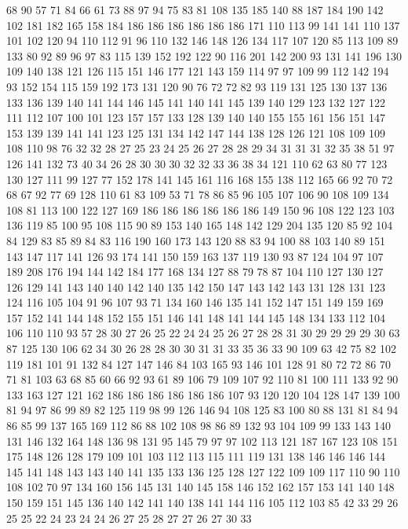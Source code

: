 68 90 57 71 84 66 61 73 88 97 94 75 83 81 108 135 185 140 88 187
184 190 142 102 181 182 165 158 184 186 186 186 186 186 186 171 110 113 99 141
141 110 137 101 102 120 94 110 112 91 96 110 132 146 148 126 134 117 107 120
85 113 109 89 133 80 92 89 96 97 83 115 139 152 192 122 90 116 201 142
200 93 131 141 196 130 109 140 138 121 126 115 151 146 177 121 143 159 114 97
97 109 99 112 142 194 93 152 154 115 159 192 173 131 120 90 76 72 72 82
93 119 131 125 130 137 136 133 136 139 140 141 144 146 145 141 140 141 145 139
140 129 123 132 127 122 111 112 107 100 101 123 157 157 133 128 139 140 140 155
155 161 156 151 147 153 139 139 141 141 123 125 131 134 142 147 144 138 128 126
121 108 109 109 108 110 98 76 32 32 28 27 25 23 24 25 26 27 28 28
29 34 31 31 31 32 35 38 51 97 126 141 132 73 40 34 26 28 30 30
30 32 32 33 36 38 34 121 110 62 63 80 77 123 130 127 111 99 127 77
152 178 141 145 161 116 168 155 138 112 165 66 92 70 72 68 67 92 77 69
128 110 61 83 109 53 71 78 86 85 96 105 107 106 90 108 109 134 108 81
113 100 122 127 169 186 186 186 186 186 186 149 150 96 108 122 123 103 136 119
85 100 95 108 115 90 89 153 140 165 148 142 129 204 135 120 85 92 104 84
129 83 85 89 84 83 116 190 160 173 143 120 88 83 94 100 88 103 140 89
151 143 147 117 141 126 93 174 141 150 159 163 137 119 130 93 87 124 104 97
107 189 208 176 194 144 142 184 177 168 134 127 88 79 78 87 104 110 127 130
127 126 129 141 143 140 140 142 140 135 142 150 147 143 142 143 131 128 131 123
124 116 105 104 91 96 107 93 71 134 160 146 135 141 152 147 151 149 159 169
157 152 141 144 148 152 155 151 146 141 148 141 144 145 148 134 133 112 104 106
110 110 93 57 28 30 27 26 25 22 24 24 25 26 27 28 28 31 30 29
29 29 29 30 63 87 125 130 106 62 34 30 26 28 28 30 30 31 31 33
35 36 33 90 109 63 42 75 82 102 119 181 101 91 132 84 127 147 146 84
103 165 93 146 101 128 91 80 72 72 86 70 71 81 103 63 68 85 60 66
92 93 61 89 106 79 109 107 92 110 81 100 111 133 92 90 133 163 127 121
162 186 186 186 186 186 186 107 93 120 120 104 128 147 139 100 81 94 97 86
99 89 82 125 119 98 99 126 146 94 108 125 83 100 80 88 131 81 84 94
86 85 99 137 165 169 112 86 88 102 108 98 86 89 132 93 104 109 99 133
143 140 131 146 132 164 148 136 98 131 95 145 79 97 97 102 113 121 187 167
123 108 151 175 148 126 128 179 109 101 103 112 113 115 111 119 131 138 146 146
146 144 145 141 148 143 143 140 141 135 133 136 125 128 127 122 109 109 117 110
90 110 108 102 70 97 134 160 156 145 131 140 145 158 146 152 162 157 153 141
140 148 150 159 151 145 136 140 142 141 140 138 141 144 116 105 112 103 85 42
33 29 26 25 25 22 24 23 24 24 26 27 25 28 27 27 26 27 30 33
